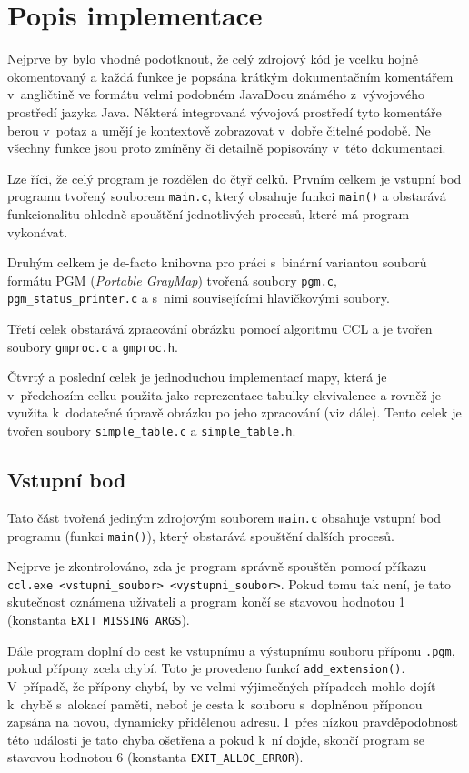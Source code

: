 \section{Popis implementace}

Nejprve by bylo vhodné podotknout, že celý zdrojový kód je vcelku hojně okomentovaný a každá funkce je popsána
krátkým dokumentačním komentářem v~angličtině ve formátu velmi podobném JavaDocu známého z~vývojového prostředí
jazyka Java. Některá integrovaná vývojová prostředí tyto komentáře berou v~potaz a umějí je kontextově zobrazovat
v~dobře čitelné podobě. Ne všechny funkce jsou proto zmíněny či detailně popisovány v~této dokumentaci.

Lze říci, že celý program je rozdělen do čtyř celků. Prvním celkem je vstupní bod programu tvořený souborem
\verb|main.c|, který obsahuje funkci \verb|main()| a obstarává funkcionalitu ohledně spouštění jednotlivých procesů,
které má program vykonávat.

Druhým celkem je de-facto knihovna pro práci s~binární variantou souborů formátu PGM (\textit{Portable GrayMap}) tvořená
soubory \verb|pgm.c|, \verb|pgm_status_printer.c| a s~nimi souvisejícími hlavičkovými soubory.

Třetí celek obstarává zpracování obrázku pomocí algoritmu CCL a je tvořen soubory \verb|gmproc.c| a \verb|gmproc.h|.

Čtvrtý a poslední celek je jednoduchou implementací mapy, která je v~předchozím celku použita jako reprezentace tabulky
ekvivalence a rovněž je využita k~dodatečné úpravě obrázku po jeho zpracování (viz dále). Tento celek je tvořen soubory
\verb|simple_table.c| a \verb|simple_table.h|.


\subsection{Vstupní bod}

Tato část tvořená jediným zdrojovým souborem \verb|main.c| obsahuje vstupní bod programu (funkci \verb|main()|), který
obstarává spouštění dalších procesů.

Nejprve je zkontrolováno, zda je program správně spouštěn pomocí příkazu
\verb|ccl.exe <vstupni_soubor> <vystupni_soubor>|. Pokud tomu tak není, je tato skutečnost oznámena uživateli a program
končí se stavovou hodnotou 1 (konstanta \verb|EXIT_MISSING_ARGS|).

Dále program doplní do cest ke vstupnímu a výstupnímu souboru příponu \verb|.pgm|, pokud přípony zcela chybí. Toto je
provedeno funkcí \verb|add_extension()|. V~případě, že přípony chybí, by ve velmi výjimečných případech mohlo dojít
k~chybě s~alokací paměti, neboť je cesta k~souboru s~doplněnou příponou zapsána na novou, dynamicky přidělenou adresu.
I~přes nízkou pravděpodobnost této události je tato chyba ošetřena a pokud k~ní dojde, skončí program se stavovou
hodnotou 6 (konstanta \verb|EXIT_ALLOC_ERROR|).

